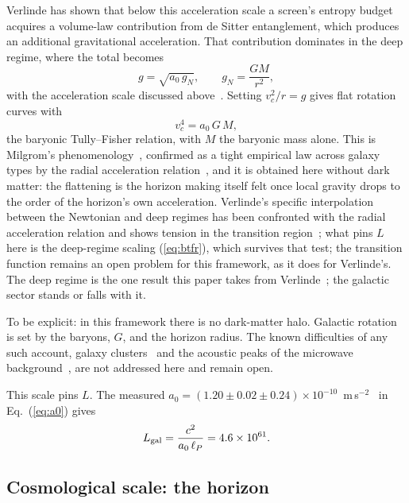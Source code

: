 \documentclass[aps,prd,twocolumn,superscriptaddress,nofootinbib,showkeys]{revtex4-2}
\begin{document}
Verlinde has shown that below this acceleration scale a screen's entropy budget acquires a volume-law contribution from de Sitter entanglement, which produces an additional gravitational acceleration. That contribution dominates in the deep regime, where the total becomes
\begin{equation}
g = \sqrt{a_0\,g_N},\qquad g_N = \frac{GM}{r^2},
\label{eq:deepmond}
\end{equation}
with the acceleration scale discussed above~\cite{verlinde2017}. Setting $v_c^2/r = g$ gives flat rotation curves with
\begin{equation}
v_c^4 = a_0\,G\,M ,
\label{eq:btfr}
\end{equation}
the baryonic Tully--Fisher relation, with $M$ the baryonic mass alone. This is Milgrom's phenomenology~\cite{milgrom1983}, confirmed as a tight empirical law across galaxy types by the radial acceleration relation~\cite{mcgaugh2016}, and it is obtained here without dark matter: the flattening is the horizon making itself felt once local gravity drops to the order of the horizon's own acceleration. Verlinde's specific interpolation between the Newtonian and deep regimes has been confronted with the radial acceleration relation and shows tension in the transition region~\cite{lelli2017}; what pins $L$ here is the deep-regime scaling (\ref{eq:btfr}), which survives that test; the transition function remains an open problem for this framework, as it does for Verlinde's. The deep regime is the one result this paper takes from Verlinde~\cite{verlinde2017}; the galactic sector stands or falls with it.

To be explicit: in this framework there is no dark-matter halo. Galactic rotation is set by the baryons, $G$, and the horizon radius. The known difficulties of any such account, galaxy clusters~\cite{clowe2006} and the acoustic peaks of the microwave background~\cite{planck2018}, are not addressed here and remain open.

This scale pins $L$. The measured $a_0 = (1.20\pm0.02\pm0.24)\times10^{-10}$~m\,s$^{-2}$~\cite{mcgaugh2016} in Eq.~(\ref{eq:a0}) gives
\begin{equation}
L_{\rm gal} = \frac{c^2}{a_0\,\ell_P} = 4.6\times10^{61}.
\label{eq:Lgal}
\end{equation}

\subsection{Cosmological scale: the horizon}
\end{document}

